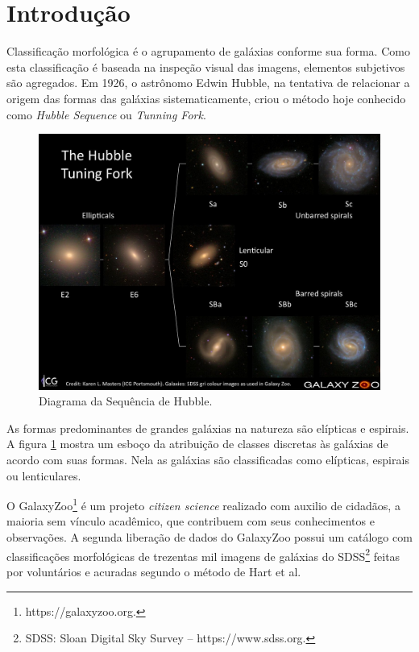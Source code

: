 \section*{Introdução}

Classificação morfológica é o agrupamento de galáxias conforme sua forma. Como esta classificação é baseada na inspeção visual das imagens, elementos subjetivos são agregados. Em 1926, o astrônomo Edwin Hubble, na tentativa de relacionar a origem das formas das galáxias sistematicamente, criou o método hoje conhecido como \emph{Hubble Sequence} ou \emph{Tunning Fork}. \cite{hubble1926, fortson2012}

\begin{figure}[h!]
    \centering
    \includegraphics[width=.8\textwidth]{figures/tuningfork1.jpg}
    \caption{Diagrama da Sequência de Hubble.}
    \label{fig:tuningfork}
\end{figure}

As formas predominantes de grandes galáxias na natureza são elípticas e espirais. A figura \ref{fig:tuningfork} mostra um esboço da atribuição de classes discretas às galáxias de acordo com suas formas. Nela as galáxias são classificadas como elípticas, espirais ou lenticulares. \cite{fortson2012}

O GalaxyZoo\footnote{https://galaxyzoo.org.} é um projeto \emph{citizen science} realizado com auxilio de cidadãos, a maioria sem vínculo acadêmico, que contribuem com seus conhecimentos e observações. A segunda liberação de dados do GalaxyZoo possui um catálogo com classificações morfológicas de trezentas mil imagens de galáxias do SDSS\footnote{SDSS: Sloan Digital Sky Survey -- https://www.sdss.org.} feitas por voluntários e acuradas segundo o método de Hart et al. \cite{hart2016}

